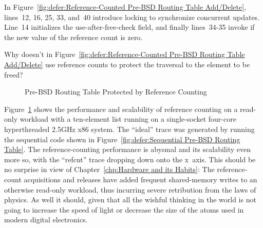In Figure~\ref{fig:defer:Reference-Counted Pre-BSD Routing Table Add/Delete},
lines~12, 16, 25, 33, and~40 introduce locking to synchronize
concurrent updates.
Line~14 initializes the  use-after-free-check field,
and finally lines~34-35 invoke  if the new value of
the reference count is zero.

\QuickQuiz{}
	Why doesn't  in
	Figure~\ref{fig:defer:Reference-Counted Pre-BSD Routing Table Add/Delete}
	use reference counts to
	protect the traversal to the element to be freed?
 \QuickQuizEnd

\begin{figure}[tb]
\centering
{}
\caption{Pre-BSD Routing Table Protected by Reference Counting}
\label{fig:defer:Pre-BSD Routing Table Protected by Reference Counting}
\end{figure}

Figure~\ref{fig:defer:Pre-BSD Routing Table Protected by Reference Counting}
shows the performance and scalability of reference counting on a
read-only workload with a ten-element list running on a
single-socket four-core hyperthreaded 2.5GHz x86 system.
The ``ideal'' trace was generated by running the sequential code shown in
Figure~\ref{fig:defer:Sequential Pre-BSD Routing Table}.
The reference-counting performance is abysmal and its scalability even
more so, with the ``refcnt'' trace dropping down onto the x~axis.
This should be no surprise in view of
Chapter~\ref{chp:Hardware and its Habits}:
The reference-count acquisitions and releases have added frequent
shared-memory writes to an otherwise read-only workload, thus
incurring severe retribution from the laws of physics.
As well it should, given that all the wishful thinking in the world
is not going to increase the speed of light or decrease the size of
the atoms used in modern digital electronics.

